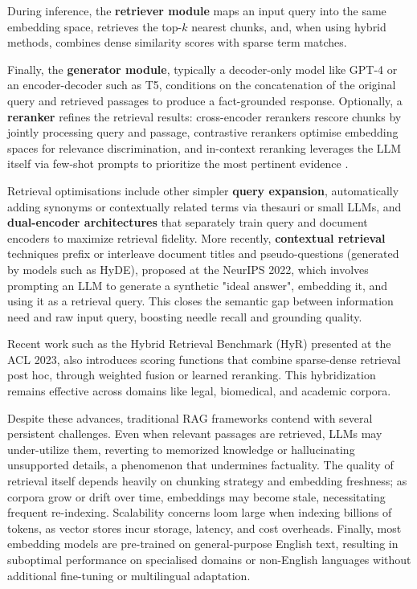 \documentclass[12pt,twoside]{report}
\begin{document}
During inference, the \textbf{retriever module} maps an input query into the same embedding space, retrieves the top-$k$ nearest chunks, and, when using hybrid methods, combines dense similarity scores with sparse term matches.

Finally, the \textbf{generator module}, typically a decoder-only model like GPT-4 or an encoder-decoder such as T5, conditions on the concatenation of the original query and retrieved passages to produce a fact-grounded response. Optionally, a \textbf{reranker} refines the retrieval results: cross-encoder rerankers rescore chunks by jointly processing query and passage, contrastive rerankers optimise embedding spaces for relevance discrimination, and in-context reranking leverages the LLM itself via few-shot prompts to prioritize the most pertinent evidence \cite{Reranking}.

Retrieval optimisations include other simpler \textbf{query expansion}, automatically adding synonyms or contextually related terms via thesauri or small LLMs, and \textbf{dual-encoder architectures} that separately train query and document encoders to maximize retrieval fidelity. More recently, \textbf{contextual retrieval} techniques prefix or interleave document titles and pseudo-questions (generated by models such as HyDE), proposed at the NeurIPS 2022\cite{HyDE}, which involves prompting an LLM to generate a synthetic "ideal answer", embedding it, and using it as a retrieval query. This closes the semantic gap between information need and raw input query, boosting needle recall and grounding quality.

Recent work such as the Hybrid Retrieval Benchmark (HyR\cite{HyR}) presented at the ACL 2023, also introduces scoring functions that combine sparse-dense retrieval post hoc, through weighted fusion or learned reranking\cite{HYRR}. This hybridization remains effective across domains like legal, biomedical, and academic corpora.

Despite these advances, traditional RAG frameworks contend with several persistent challenges. Even when relevant passages are retrieved, LLMs may under-utilize them, reverting to memorized knowledge or hallucinating unsupported details, a phenomenon that undermines factuality. The quality of retrieval itself depends heavily on chunking strategy and embedding freshness; as corpora grow or drift over time, embeddings may become stale, necessitating frequent re-indexing. Scalability concerns loom large when indexing billions of tokens, as vector stores incur storage, latency, and cost overheads. Finally, most embedding models are pre-trained on general-purpose English text, resulting in suboptimal performance on specialised domains or non-English languages without additional fine-tuning or multilingual adaptation.
\end{document}
